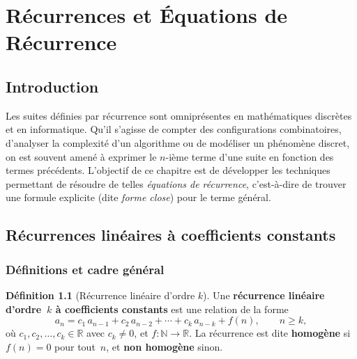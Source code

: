 \documentclass[12pt,a4paper,openany]{book}
\theoremstyle{definition}
\newtheorem{definition}{Définition}[chapter]
\theoremstyle{plain}
\theoremstyle{remark}
\newcommand{\N}{\mathbb{N}}
\newcommand{\R}{\mathbb{R}}
\begin{document}
\chapter{Récurrences et Équations de Récurrence}
\label{ch:recurrences}

\minitoc

\section*{Introduction}

Les suites définies par récurrence sont omniprésentes en mathématiques discrètes
et en informatique. Qu'il s'agisse de compter des configurations combinatoires,
d'analyser la complexité d'un algorithme ou de modéliser un phénomène discret,
on est souvent amené à exprimer le $n$-ième terme d'une suite en fonction des
termes précédents. L'objectif de ce chapitre est de développer les techniques
permettant de résoudre de telles \emph{équations de récurrence},
c'est-à-dire de trouver une formule explicite (dite \emph{forme close})
pour le terme général.

\section{Récurrences linéaires à coefficients constants}
\label{sec:rec-lineaires}

\subsection{Définitions et cadre général}

\begin{definition}[Récurrence linéaire d'ordre $k$]
\label{def:rec-lineaire}
Une \textbf{récurrence linéaire d'ordre~$k$ à coefficients constants}
est une relation de la forme
\[
  a_n = c_1\, a_{n-1} + c_2\, a_{n-2} + \cdots + c_k\, a_{n-k} + f(n),
  \qquad n \geq k,
\]
où $c_1, c_2, \ldots, c_k \in \R$ avec $c_k \neq 0$, et $f\colon \N \to \R$.
La récurrence est dite \textbf{homogène}
si $f(n) = 0$ pour tout~$n$, et \textbf{non homogène} sinon.
\end{definition}
\end{document}
